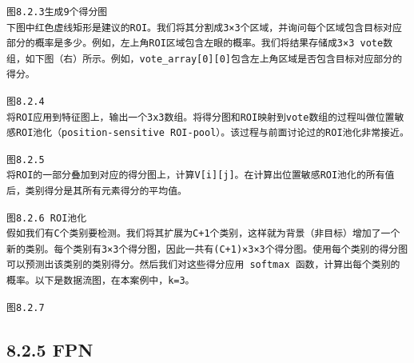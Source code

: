 \begin{verbatim}
图8.2.3生成9个得分图
下图中红色虚线矩形是建议的ROI。我们将其分割成3×3个区域，并询问每个区域包含目标对应部分的概率是多少。例如，左上角ROI区域包含左眼的概率。我们将结果存储成3×3 vote数组，如下图（右）所示。例如，vote_array[0][0]包含左上角区域是否包含目标对应部分的得分。
\end{verbatim}

\begin{figure}
\centering
\caption{}
\end{figure}

\begin{verbatim}
图8.2.4
将ROI应用到特征图上，输出一个3x3数组。将得分图和ROI映射到vote数组的过程叫做位置敏感ROI池化（position-sensitive ROI-pool）。该过程与前面讨论过的ROI池化非常接近。
\end{verbatim}

\begin{figure}
\centering
\caption{}
\end{figure}

\begin{verbatim}
图8.2.5
将ROI的一部分叠加到对应的得分图上，计算V[i][j]。在计算出位置敏感ROI池化的所有值后，类别得分是其所有元素得分的平均值。
\end{verbatim}

\begin{figure}
\centering
\caption{}
\end{figure}

\begin{verbatim}
图8.2.6 ROI池化
假如我们有C个类别要检测。我们将其扩展为C+1个类别，这样就为背景（非目标）增加了一个新的类别。每个类别有3×3个得分图，因此一共有(C+1)×3×3个得分图。使用每个类别的得分图可以预测出该类别的类别得分。然后我们对这些得分应用 softmax 函数，计算出每个类别的概率。以下是数据流图，在本案例中，k=3。
\end{verbatim}

\begin{figure}
\centering
\caption{}
\end{figure}

\begin{verbatim}
图8.2.7
\end{verbatim}

\subsection{8.2.5 FPN}\label{fpn}

